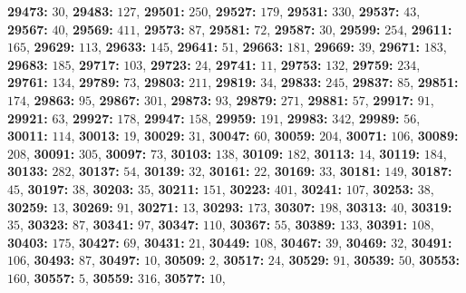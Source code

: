 \textsf{\bfseries 29473:} $30$, \textsf{\bfseries 29483:} $127$, \textsf{\bfseries 29501:} $250$, \textsf{\bfseries 29527:} $179$, \textsf{\bfseries 29531:} $330$, \textsf{\bfseries 29537:} $43$, \textsf{\bfseries 29567:} $40$, \textsf{\bfseries 29569:} $411$, \textsf{\bfseries 29573:} $87$, \textsf{\bfseries 29581:} $72$, \textsf{\bfseries 29587:} $30$, \textsf{\bfseries 29599:} $254$, \textsf{\bfseries 29611:} $165$, \textsf{\bfseries 29629:} $113$, \textsf{\bfseries 29633:} $145$, \textsf{\bfseries 29641:} $51$, \textsf{\bfseries 29663:} $181$, \textsf{\bfseries 29669:} $39$, \textsf{\bfseries 29671:} $183$, \textsf{\bfseries 29683:} $185$, \textsf{\bfseries 29717:} $103$, \textsf{\bfseries 29723:} $24$, \textsf{\bfseries 29741:} $11$, \textsf{\bfseries 29753:} $132$, \textsf{\bfseries 29759:} $234$, \textsf{\bfseries 29761:} $134$, \textsf{\bfseries 29789:} $73$, \textsf{\bfseries 29803:} $211$, \textsf{\bfseries 29819:} $34$, \textsf{\bfseries 29833:} $245$, \textsf{\bfseries 29837:} $85$, \textsf{\bfseries 29851:} $174$, \textsf{\bfseries 29863:} $95$, \textsf{\bfseries 29867:} $301$, \textsf{\bfseries 29873:} $93$, \textsf{\bfseries 29879:} $271$, \textsf{\bfseries 29881:} $57$, \textsf{\bfseries 29917:} $91$, \textsf{\bfseries 29921:} $63$, \textsf{\bfseries 29927:} $178$, \textsf{\bfseries 29947:} $158$, \textsf{\bfseries 29959:} $191$, \textsf{\bfseries 29983:} $342$, \textsf{\bfseries 29989:} $56$, \textsf{\bfseries 30011:} $114$, \textsf{\bfseries 30013:} $19$, \textsf{\bfseries 30029:} $31$, \textsf{\bfseries 30047:} $60$, \textsf{\bfseries 30059:} $204$, \textsf{\bfseries 30071:} $106$, \textsf{\bfseries 30089:} $208$, \textsf{\bfseries 30091:} $305$, \textsf{\bfseries 30097:} $73$, \textsf{\bfseries 30103:} $138$, \textsf{\bfseries 30109:} $182$, \textsf{\bfseries 30113:} $14$, \textsf{\bfseries 30119:} $184$, \textsf{\bfseries 30133:} $282$, \textsf{\bfseries 30137:} $54$, \textsf{\bfseries 30139:} $32$, \textsf{\bfseries 30161:} $22$, \textsf{\bfseries 30169:} $33$, \textsf{\bfseries 30181:} $149$, \textsf{\bfseries 30187:} $45$, \textsf{\bfseries 30197:} $38$, \textsf{\bfseries 30203:} $35$, \textsf{\bfseries 30211:} $151$, \textsf{\bfseries 30223:} $401$, \textsf{\bfseries 30241:} $107$, \textsf{\bfseries 30253:} $38$, \textsf{\bfseries 30259:} $13$, \textsf{\bfseries 30269:} $91$, \textsf{\bfseries 30271:} $13$, \textsf{\bfseries 30293:} $173$, \textsf{\bfseries 30307:} $198$, \textsf{\bfseries 30313:} $40$, \textsf{\bfseries 30319:} $35$, \textsf{\bfseries 30323:} $87$, \textsf{\bfseries 30341:} $97$, \textsf{\bfseries 30347:} $110$, \textsf{\bfseries 30367:} $55$, \textsf{\bfseries 30389:} $133$, \textsf{\bfseries 30391:} $108$, \textsf{\bfseries 30403:} $175$, \textsf{\bfseries 30427:} $69$, \textsf{\bfseries 30431:} $21$, \textsf{\bfseries 30449:} $108$, \textsf{\bfseries 30467:} $39$, \textsf{\bfseries 30469:} $32$, \textsf{\bfseries 30491:} $106$, \textsf{\bfseries 30493:} $87$, \textsf{\bfseries 30497:} $10$, \textsf{\bfseries 30509:} $2$, \textsf{\bfseries 30517:} $24$, \textsf{\bfseries 30529:} $91$, \textsf{\bfseries 30539:} $50$, \textsf{\bfseries 30553:} $160$, \textsf{\bfseries 30557:} $5$, \textsf{\bfseries 30559:} $316$, \textsf{\bfseries 30577:} $10$, 
